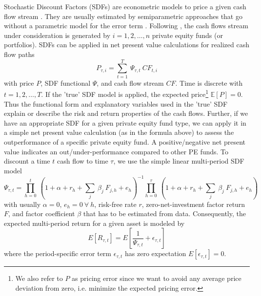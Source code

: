 \documentclass[12pt]{article}
\begin{document}
Stochastic Discount Factors (SDFs) are econometric models to price a given cash flow stream \citep{HR87}.
They are usually estimated by semiparametric approaches that go without a parametric model for the error term \citep{F19}.
Following \cite{DLP12}, the cash flows stream under consideration is generated by $i=1,2,\dots,n$ private equity funds (or portfolios).
SDFs can be applied in net present value calculations for realized cash flow paths
\begin{equation}
\label{eq:pricing_error}
P_{\tau, i} =
\sum_{t=1}^{T}\ \Psi_{\tau, t}\ {CF}_{t, i}
\end{equation}
with price $P$, SDF functional $\Psi$, and cash flow stream $CF$. 
Time is discrete with $t=1,2,\dots,T$.
If the 'true' SDF model is applied, the expected price\footnote{We also refer to $P$ as pricing error since we want to avoid any average price deviation from zero, i.e. minimize the expected pricing error.} $\mathbb{E}[P]=0$. 
Thus the functional form and explanatory variables used in the 'true' SDF explain or describe the risk and return properties of the cash flows. 
Further, if we have an appropriate SDF for a given private equity fund type, we can apply it in a simple net present value calculation (as in the formula above) to assess the outperformance of a specific private equity fund. 
A positive/negative net present value indicates an out/under-performance compared to other PE funds.
To discount a time $t$ cash flow to time $\tau$, we use the simple linear multi-period SDF model
\begin{equation}
\label{eq:linear_sdf}
\Psi_{\tau,t} =
\prod_{h=0}^{t}\ \left(1+ \alpha + r_{h} + \sum_j\ \beta_j\ F_{j,h} + e_h \right)^{-1}
\prod_{h=0}^{\tau}\ \left(1 + \alpha + r_{h} + \sum_j\ \beta_j\ F_{j,h} + e_h \right)
\end{equation}
with usually $\alpha=0$, $e_h=0 \ \forall \ h$, risk-free rate $r$, zero-net-investment factor return $F$, and factor coefficient $\beta$ that has to be estimated from data. 
Consequently, the expected multi-period return for a given asset is modeled by
\[
E \left[R_{\tau,t} \right] = 
E \left[ \frac{1}{\Psi_{\tau,t}} + \epsilon_{\tau,t} \right]
\]
where the period-specific error term $\epsilon_{\tau,t}$ has zero expectation $E[\epsilon_{\tau,t}]=0$.
\end{document}
